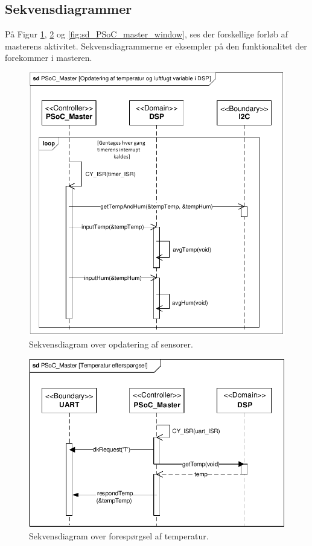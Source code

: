 \clearpage

\subsection{Sekvensdiagrammer}

På Figur \ref{fig:sd_PSoC_master_sensor}, \ref{fig:sd_PSoC_master_tempreq} og \ref{fig:sd_PSoC_master_window}, ses der forskellige forløb af masterens aktivitet. Sekvensdiagrammerne er eksempler på den funktionalitet der forekommer i masteren. 

\begin{figure}[h]
\centering
\includegraphics[scale=1]{../fig/sd_PSoC_master_update_sensor_values}
\caption{Sekvensdiagram over opdatering af sensorer.}
\label{fig:sd_PSoC_master_sensor}
\end{figure}

\begin{figure}[h]
\centering
\includegraphics[scale=1]{../fig/sd_PSoC_master_tempreq}
\caption{Sekvensdiagram over forespørgsel af temperatur.}
\label{fig:sd_PSoC_master_tempreq}
\end{figure}

